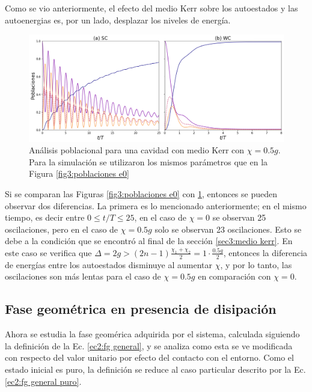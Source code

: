 Como se vio anteriormente, el efecto del medio Kerr sobre los autoestados y las autoenergias es, por un lado, desplazar los niveles de energía.
\begin{figure}
    \centering
    \includegraphics[width=\textwidth]{figuras/ch3/poblaciones kerr.png}
    \caption{Análisis poblacional para una cavidad con medio Kerr con $\chi=0.5g$. Para la simulación se utilizaron los mismos parámetros que en la Figura \ref{fig3:poblaciones e0}}
    \label{fig3:poblaciones kerr}
\end{figure}
Si se comparan las Figuras \ref{fig3:poblaciones e0} con \ref{fig3:poblaciones kerr}, entonces se pueden observar dos diferencias. La primera es lo mencionado anteriormente; en el mismo tiempo, es decir entre $0\leq t/T \leq 25$, en el caso de $\chi=0$ se observan 25 oscilaciones, pero en el caso de $\chi=0.5g$ solo se observan 23 oscilaciones. Esto se debe a la condición que se encontró al final de la sección \ref{sec3:medio kerr}. En este caso se verifica que $\Delta=2g>(2n-1)\frac{\chi_1+\chi_2}{2}=1\cdot\frac{0.5g}{2}$, entonces la diferencia de energías entre los autoestados disminuye al aumentar $\chi$, y por lo tanto, las oscilaciones son más lentas para el caso de $\chi=0.5g$ en comparación con $\chi=0$.

\subsection{Fase geométrica en presencia de disipación}
\label{sec3:fg disipacion}
Ahora se estudia la fase geomérica adquirida por el sistema, calculada siguiendo la definición de la Ec. \ref{ec2:fg general}, y se analiza como esta se ve modificada con respecto del valor unitario por efecto del contacto con el entorno. Como el estado inicial es puro, la definición se reduce al caso particular descrito por la Ec. \ref{ec2:fg general puro}.

